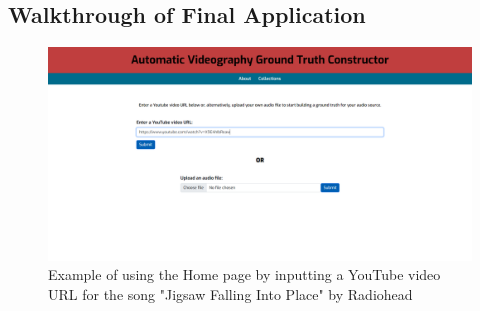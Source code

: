 \documentclass{l4proj}
\begin{document}
\begin{appendices}


\chapter{Walkthrough of Final Application}
\label{app:walkthrough}
\begin{figure}
    \centering
    \includegraphics[width=1\textwidth]{figures/walkthrough_home_page.pdf}
    \caption{Example of using the Home page by inputting a YouTube video URL for the song "Jigsaw Falling Into Place" by Radiohead}
    \label{fig:walkthrough_home_page}
\end{figure}


\end{appendices}
\end{document}
